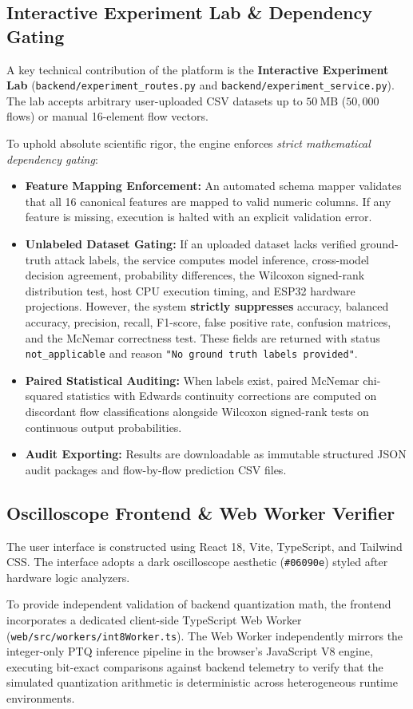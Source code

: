 \subsection{Interactive Experiment Lab & Dependency Gating}
A key technical contribution of the platform is the \textbf{Interactive Experiment Lab} (\texttt{backend/experiment\_routes.py} and \texttt{backend/experiment\_service.py}). The lab accepts arbitrary user-uploaded CSV datasets up to $50\ \text{MB}$ ($50,000$ flows) or manual 16-element flow vectors.

To uphold absolute scientific rigor, the engine enforces \emph{strict mathematical dependency gating}:
\begin{itemize}
    \item \textbf{Feature Mapping Enforcement:} An automated schema mapper validates that all 16 canonical features are mapped to valid numeric columns. If any feature is missing, execution is halted with an explicit validation error.
    \item \textbf{Unlabeled Dataset Gating:} If an uploaded dataset lacks verified ground-truth attack labels, the service computes model inference, cross-model decision agreement, probability differences, the Wilcoxon signed-rank distribution test, host CPU execution timing, and ESP32 hardware projections. However, the system \textbf{strictly suppresses} accuracy, balanced accuracy, precision, recall, F1-score, false positive rate, confusion matrices, and the McNemar correctness test. These fields are returned with status \texttt{not\_applicable} and reason \texttt{"No ground truth labels provided"}.
    \item \textbf{Paired Statistical Auditing:} When labels exist, paired McNemar chi-squared statistics with Edwards continuity corrections are computed on discordant flow classifications alongside Wilcoxon signed-rank tests on continuous output probabilities.
    \item \textbf{Audit Exporting:} Results are downloadable as immutable structured JSON audit packages and flow-by-flow prediction CSV files.
\end{itemize}

\subsection{Oscilloscope Frontend & Web Worker Verifier}
The user interface is constructed using React 18, Vite, TypeScript, and Tailwind CSS. The interface adopts a dark oscilloscope aesthetic (\texttt{\#06090e}) styled after hardware logic analyzers.

To provide independent validation of backend quantization math, the frontend incorporates a dedicated client-side TypeScript Web Worker (\texttt{web/src/workers/int8Worker.ts}). The Web Worker independently mirrors the integer-only PTQ inference pipeline in the browser's JavaScript V8 engine, executing bit-exact comparisons against backend telemetry to verify that the simulated quantization arithmetic is deterministic across heterogeneous runtime environments.
